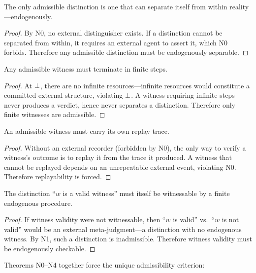 \begin{theorem}
\label{thm:N1}
The only admissible distinction is one that can separate itself from
within reality---endogenously.
\begin{proof}
By N0, no external distinguisher exists.  If a distinction cannot be
separated from within, it requires an external agent to assert it, which
N0 forbids.  Therefore any admissible distinction must be endogenously
separable.
\end{proof}
\end{theorem}

\begin{theorem}[N2 --- Finiteness]
\label{thm:N2}
Any admissible witness must terminate in finite steps.
\begin{proof}
At $\bot$, there are no infinite resources---infinite resources would
constitute a committed external structure, violating $\bot$.  A witness
requiring infinite steps never produces a verdict, hence never separates
a distinction.  Therefore only finite witnesses are admissible.
\end{proof}
\end{theorem}

\begin{theorem}[N3 --- Replayability]
\label{thm:N3}
An admissible witness must carry its own replay trace.
\begin{proof}
Without an external recorder (forbidden by N0), the only way to verify a
witness's outcome is to replay it from the trace it produced.  A witness
that cannot be replayed depends on an unrepeatable external event,
violating N0.  Therefore replayability is forced.
\end{proof}
\end{theorem}

\begin{theorem}
\label{thm:N4}
The distinction ``$w$ is a valid witness'' must itself be witnessable by
a finite endogenous procedure.
\begin{proof}
If witness validity were not witnessable, then ``$w$ is valid'' vs.\
``$w$ is not valid'' would be an external meta-judgment---a distinction
with no endogenous witness.  By N1, such a distinction is inadmissible.
Therefore witness validity must be endogenously checkable.
\end{proof}
\end{theorem}

\medskip\noindent
Theorems N0--N4 together force the unique admissibility criterion:

